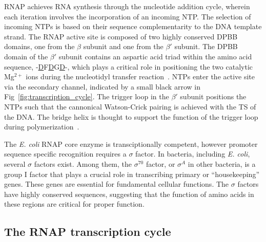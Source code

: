 RNAP achieves RNA synthesis through the nucleotide addition cycle, wherein each iteration involves the incorporation of an incoming NTP. 
The selection of incoming NTPs is based on their sequence complementarity to the DNA template strand. 
The RNAP active site is composed of two highly conserved \ac{DPBB} domains, one from the $\beta$ subunit and one from the $\beta'$ subunit. 
The DPBB domain of the $\beta'$ subunit contains an aspartic acid triad within the amino acid sequence, -\underline{D}F\underline{D}G\underline{D}-, which plays a critical role in positioning the two catalytic Mg$^{2+}$ ions during the nucleotidyl transfer reaction~\cite{murakami_JBC_2013}.
NTPs enter the active site via the secondary channel, indicated by a small black arrow in Fig~\ref{fig:transcription_cycle}. 
The trigger loop in the $\beta'$ subunit positions the NTPs such that the cannonical Watson-Crick pairing is achieved with the \ac{TS} of the DNA. 
The bridge helix is thought to support the function of the trigger loop during polymerization~\cite{murakami_JBC_2013}.

The \textit{\ac{E. coli}} RNAP core enzyme is transciptionally competent, however promoter sequence specific recognition requires a $\sigma$ factor.
In bacteria, including \textit{\ac{E. coli}}, several $\sigma$ factors exist. 
Among them, the $\sigma^{70}$ factor, or $\sigma^A$ in other bacteria, is a group I factor that plays a crucial role in transcribing primary or \enquote{housekeeping} genes. 
These genes are essential for fundamental cellular functions.
The $\sigma$ factors have highly conserved sequences, suggesting that the function of amino acids in these regions are critical for proper function.

\subsection{The RNAP transcription cycle}
\label{sec:RNAP_cycle}

